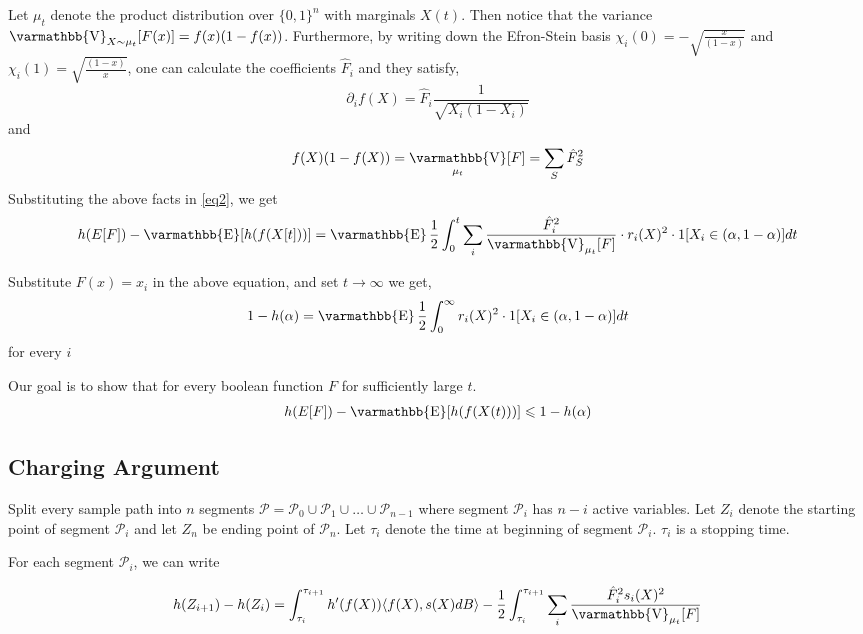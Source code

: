 \documentclass
[12pt,letterpaper]
{article}
\theoremstyle{definition}
\theoremstyle{remark}
\let\mathbb\varmathbb
\newcommand{\iprod}[1]{\langle#1\rangle}
\newcommand{\Esymb}{\mathbb{E}}
\newcommand{\Vsymb}{\mathbb{V}}
\DeclareMathOperator*{\E}{\Esymb}
\DeclareMathOperator*{\Var}{\Vsymb}
\newcommand{\cP}{\mathcal P}
\renewcommand{\leq}{\leqslant}
\numberwithin{equation}{section}
\begin{document}
Let $\mu_t$ denote the product distribution over $\{0,1\}^n$ with marginals $X(t)$.  Then notice that the variance $\Var_{X \sim \mu_t} [F(x)] = f(x)(1-f(x))$.  Furthermore, by writing down the Efron-Stein basis $\chi_i(0) = -\sqrt{\frac{x}{(1-x)}}$ and $\chi_i(1) = \sqrt{\frac{(1-x)}{x}}$, one can calculate the coefficients $\hat{F}_i$ and they satisfy,
\[ \partial_i f(X) = \hat{F}_i \frac{1}{\sqrt{X_i(1-X_i)}}\]
and 
\[f(X)(1-f(X)) = \Var_{\mu_t}[F] = \sum_S \hat{F}_S^2 \]
Substituting the above facts in \eqref{eq2}, we get
\begin{align} \label{eq34}
 h(E[F]) - \E[h(f(X[t]))]  =  \E \frac{1}{2} \int_0^t \sum_i \frac{\hat{F}_i^2}{\Var_{\mu_t}[F]} \cdot r_i(X)^2 \cdot 1[X_i \in (\alpha,1-\alpha)]  dt  
\end{align}

Substitute $F(x) = x_i$ in the above equation, and set $t \to \infty$ we get,
\begin{align} \label{eq35}
1 - h(\alpha) =  \E \frac{1}{2} \int_{0}^{\infty}  r_i(X)^2 \cdot 1[X_i \in (\alpha,1-\alpha)]  dt  
\end{align}
for every $i$

Our goal is to show that for every boolean function $F$ for sufficiently large $t$.
\begin{align} \label{eq36}
h(E[F]) - \E[h(f(X(t)))] \leq 1 - h(\alpha)
\end{align}





\subsection{Charging Argument}

Split every sample path into $n$ segments $\cP = \cP_0 \cup \cP_1 \cup \ldots \cup \cP_{n-1}$ where segment $\cP_i$ has $n-i$ active variables.
Let $Z_i$ denote the starting point of segment $\cP_i$ and let $Z_n$ be ending point of $\cP_n$.  Let $\tau_i$ denote the time at beginning of segment $\cP_i$.  $\tau_i$ is a stopping time.


For each segment $\cP_i$, we can write

\begin{align}
	h(Z_{i+1})-h(Z_i) = \int_{\tau_i}^{\tau_{i+1}} h'(f(X))\iprod{f(X), s(X)dB} - \frac{1}{2} \int_{\tau_i}^{\tau_{i+1}} \sum_{i} \frac{\hat{F}_i^2s_i(X)^2}{\Var_{\mu_t}[F]}
\end{align}
\end{document}
